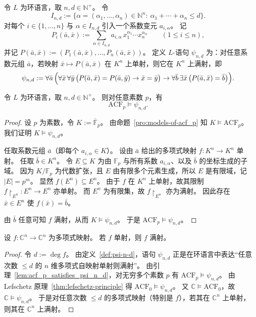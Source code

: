 \documentclass[lang=cn,a4paper,newtx,section]{elegantbook}
\begin{document}
 \begin{definition}[$\psi_{n,d}$]
 \label{psi-n-d}
 令 $L$ 为环语言，取 $n,d\in\mathbb N^{+}$。
 令
 \[
   I_{n,d}:=\{\alpha=(\alpha_1,\dots,\alpha_n)\in\mathbb N^n:\ \alpha_1+\cdots+\alpha_n\le d\}.
 \]
 对每个 $i\in\{1,\dots,n\}$ 与 $\alpha\in I_{n,d}$ 引入一个系数变元 $a_{i,\alpha}$。
 记
 \[
   P_i(\bar a,\bar x):=\sum_{\alpha\in I_{n,d}} a_{i,\alpha}\,x_1^{\alpha_1}\cdots x_n^{\alpha_n}\qquad(1\le i\le n),
 \]
 并记 $P(\bar a,\bar x):=(P_1(\bar a,\bar x),\dots,P_n(\bar a,\bar x))$。
 定义 $L$-语句 $\psi_{n,d}$ 为：对任意系数元组 $\bar a$，若映射 $\bar x\mapsto P(\bar a,\bar x)$ 在 $K^n$ 上单射，则它在 $K^n$ 上满射，即
 \[
 \psi_{n,d}:=\forall \bar a\,\Bigl(\forall \bar x\,\forall \bar y\,\bigl(P(\bar a,\bar x)=P(\bar a,\bar y)\to \bar x=\bar y\bigr)\to\forall \bar b\,\exists \bar x\,\bigl(P(\bar a,\bar x)=\bar b\bigr)\Bigr).
 \]
 \end{definition}
 
 \begin{lemma}
 \label{acf_p_satisfies_psi_n_d}
 令 $L$ 为环语言，取 $n,d\in\mathbb N^{+}$。
 则对任意素数 $p$，有
 \[
   \mathrm{ACF}_p\models\psi_{n,d}.
 \]
 \end{lemma}
 
 \begin{proof}
 设 $p$ 为素数，令 $K:=\overline{\mathbb F}_p$。
 由命题~\ref{pro:models-of-acf_p} 知 $K\models\mathrm{ACF}_p$。
 我们证明 $K\models\psi_{n,d}$。
 
 任取系数元组 $\bar a$（即每个 $a_{i,\alpha}\in K$）。
 设由 $\bar a$ 给出的多项式映射 $f:K^n\to K^n$ 单射。
 任取 $\bar b\in K^n$。
 令 $E\subseteq K$ 为由 $\mathbb F_p$ 与所有系数 $a_{i,\alpha}$、以及 $\bar b$ 的坐标生成的子域。
 因为 $K/\mathbb F_p$ 为代数扩张，且 $E$ 由有限多个元素生成，所以 $E$ 是有限域，记 $\lvert E\rvert=p^m$。
 显然 $f(E^n)\subseteq E^n$。
 由于 $f$ 在 $K^n$ 上单射，故其限制 $f\restriction_{E^n}:E^n\to E^n$ 亦单射。
 而 $E^n$ 为有限集，故 $f\restriction_{E^n}$ 亦为满射。
 因此存在 $\bar x\in E^n$ 使 $f(\bar x)=\bar b$。
 
 由 $\bar b$ 任意可知 $f$ 满射，从而 $K\models\psi_{n,d}$。
 于是 $\mathrm{ACF}_p\models\psi_{n,d}$。
 \end{proof}
 
 \begin{theorem}[Ax--Grothendieck]
 \label{ax-grothendieck}
 设 $f:\mathbb C^n\to\mathbb C^n$ 为多项式映射。
 若 $f$ 单射，则 $f$ 满射。
 \end{theorem}
 
 \begin{proof}
 令 $d:=\deg f$。
 由定义~\ref{def:psi-n-d}，语句 $\psi_{n,d}$ 正是在环语言中表达“任意次数 $\le d$ 的 $n$ 维多项式自映射单射则满射”。
 由引理~\ref{lem:acf_p_satisfies_psi_n_d}，对无穷多个素数 $p$ 有 $\mathrm{ACF}_p\models\psi_{n,d}$。
 由 Lefschetz 原理~\ref{thm:lefschetz-principle} 得 $\mathrm{ACF}_0\models\psi_{n,d}$。
 又 $\mathbb C\models\mathrm{ACF}_0$，故 $\mathbb C\models\psi_{n,d}$。
 于是对任意次数 $\le d$ 的多项式映射（特别是 $f$），若其在 $\mathbb C^n$ 上单射，则其在 $\mathbb C^n$ 上满射。
 \end{proof}
\end{document}
